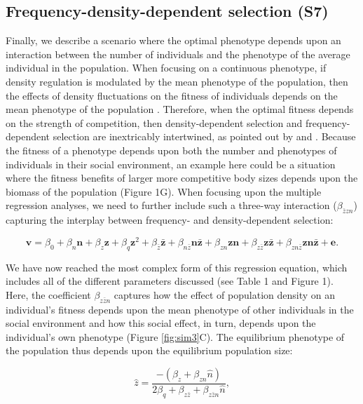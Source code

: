\documentclass{article}
\begin{document}
\subsection{Frequency-density-dependent selection (S7)}
Finally, we describe a scenario where the optimal phenotype depends upon an interaction between the number of individuals and the phenotype of the average individual in the population. When focusing on a continuous phenotype, if density regulation is modulated by the mean phenotype of the population, then the effects of density fluctuations on the fitness of individuals depends on the mean phenotype of the population \citep{Engen2020}. Therefore, when the optimal fitness depends on the strength of competition, then density-dependent selection and frequency-dependent selection are inextricably intertwined, as pointed out by \cite{Smouse1976} and \cite{Heino1998}. Because the fitness of a phenotype depends upon both the number and phenotypes of individuals in their social environment, an example here could be a situation where the fitness benefits of larger more competitive body sizes depends upon the biomass of the population (Figure 1G). When focusing upon the multiple regression analyses, we need to further include such a three-way interaction ($\beta_{\bar{z}zn}$) capturing the interplay between frequency- and density-dependent selection:

\begin{equation} \label{eq: fullw}
\bm{v}=\beta_{0} +\beta_{n} \bm{n} + \beta_{z} \bm{z} + \beta_{q} \bm{z}^2 + \beta_{\bar{z}} \bm{\bar{z}}  +   \beta_{n\bar{z}} \bm{n\bar{z}} +   \beta_{zn} \bm{zn} + \beta_{z\bar{z}} \bm{z\bar{z}}   +   \beta_{zn\bar{z}} \bm{zn\bar{z}} + \bm{e}.
\end{equation}

\noindent We have now reached the most complex form of this regression equation, which includes all of the different parameters discussed (see Table 1 and Figure 1). Here, the coefficient $\beta_{z\bar{z}n}$ captures how the effect of population density on an individual's fitness depends upon the mean phenotype of other individuals in the social environment and how this social effect, in turn, depends upon the individual's own phenotype (Figure \ref{fig:sim3}C). The equilibrium phenotype of the population thus depends upon the equilibrium population size: 

\begin{equation} 
\hat{z}=\frac{-(\beta_{z}+\beta_{zn}\hat{n})}{2\beta_{q} + \beta_{z\bar{z}} + \beta_{z\bar{z}n}\hat{n}},
\end{equation} 
\end{document}
